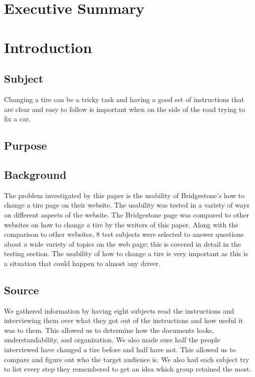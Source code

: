 \documentclass[12pt,A4paper]{article}
\begin{document}
	\section{Executive Summary}

	\section{Introduction}
	
		\subsection{Subject}
		Changing a tire can be a tricky task and having a good set of instructions that are clear and easy to follow is important when on the side of the road trying to fix a car.

		\subsection{Purpose}

		\subsection{Background}
		The problem investigated by this paper is the usability of Bridgestone’s how to change a tire page on their website. The usability was tested in a variety of ways on different aspects of the website. The Bridgestone page was compared to other websites on how to change a tire by the writers of this paper. Along with the comparison to other websites, 8 test subjects were selected to answer questions about a wide variety of topics on the web page; this is covered in detail in the testing section. The usability of how to change a tire is very important as this is a situation that could happen to almost any driver.

		\subsection{Source}
		We gathered information by having eight subjects read the instructions and interviewing them over what they got out of the instructions and how useful it was to them. This allowed us to determine how the documents looks, understandability, and organization. We also made sure half the people interviewed have changed a tire before and half have not. This allowed us to compare and figure out who the target audience is. We also had each subject try to list every step they remembered to get an idea which group retained the most.
\end{document}
